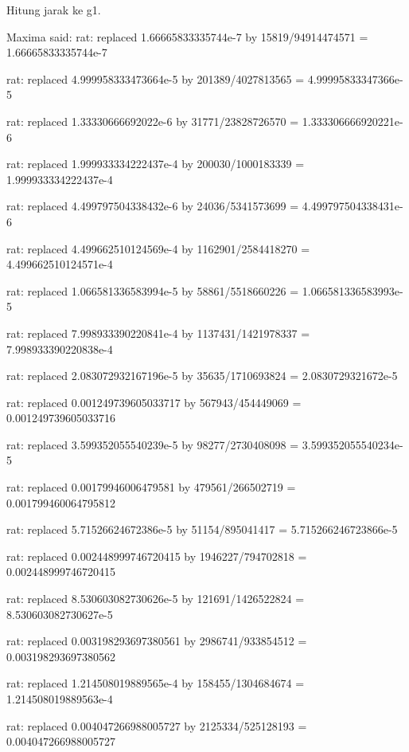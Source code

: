 \documentclass[a4paper,10pt]{article}
\begin{document}
\begin{eulernotebook}
\begin{eulercomment}
\begin{eulercomment}
\begin{eulercomment}
\begin{eulercomment}
\begin{eulercomment}
\begin{eulercomment}
\begin{eulercomment}
\begin{eulercomment}
\begin{eulercomment}
\begin{eulercomment}
\begin{eulercomment}
\begin{eulercomment}
\begin{eulercomment}
\begin{eulercomment}
\begin{eulercomment}
\begin{eulercomment}
\begin{euleroutput}
\end{euleroutput}
\begin{eulercomment}
Hitung jarak ke g1.
\end{eulercomment}
\begin{euleroutput}
  Maxima said:
  rat: replaced 1.66665833335744e-7 by 15819/94914474571 = 1.66665833335744e-7
  
  rat: replaced 4.999958333473664e-5 by 201389/4027813565 = 4.99995833347366e-5
  
  rat: replaced 1.33330666692022e-6 by 31771/23828726570 = 1.333306666920221e-6
  
  rat: replaced 1.999933334222437e-4 by 200030/1000183339 = 1.999933334222437e-4
  
  rat: replaced 4.499797504338432e-6 by 24036/5341573699 = 4.499797504338431e-6
  
  rat: replaced 4.499662510124569e-4 by 1162901/2584418270 = 4.499662510124571e-4
  
  rat: replaced 1.066581336583994e-5 by 58861/5518660226 = 1.066581336583993e-5
  
  rat: replaced 7.998933390220841e-4 by 1137431/1421978337 = 7.998933390220838e-4
  
  rat: replaced 2.083072932167196e-5 by 35635/1710693824 = 2.0830729321672e-5
  
  rat: replaced 0.001249739605033717 by 567943/454449069 = 0.001249739605033716
  
  rat: replaced 3.599352055540239e-5 by 98277/2730408098 = 3.599352055540234e-5
  
  rat: replaced 0.00179946006479581 by 479561/266502719 = 0.001799460064795812
  
  rat: replaced 5.71526624672386e-5 by 51154/895041417 = 5.715266246723866e-5
  
  rat: replaced 0.002448999746720415 by 1946227/794702818 = 0.002448999746720415
  
  rat: replaced 8.530603082730626e-5 by 121691/1426522824 = 8.530603082730627e-5
  
  rat: replaced 0.003198293697380561 by 2986741/933854512 = 0.003198293697380562
  
  rat: replaced 1.214508019889565e-4 by 158455/1304684674 = 1.214508019889563e-4
  
  rat: replaced 0.004047266988005727 by 2125334/525128193 = 0.004047266988005727
  

\end{euleroutput}
\end{eulercomment}
\end{eulercomment}
\end{eulercomment}
\end{eulercomment}
\end{eulercomment}
\end{eulercomment}
\end{eulercomment}
\end{eulercomment}
\end{eulercomment}
\end{eulercomment}
\end{eulercomment}
\end{eulercomment}
\end{eulercomment}
\end{eulercomment}
\end{eulercomment}
\end{eulercomment}
\end{eulernotebook}
\end{document}
